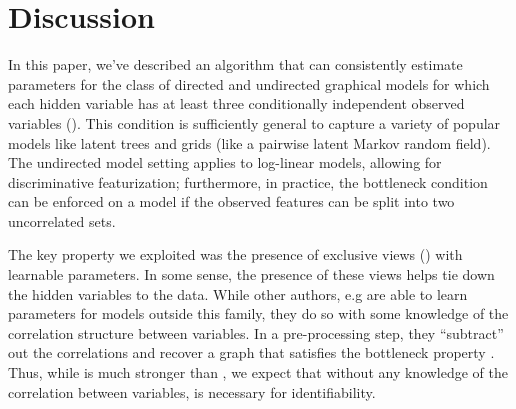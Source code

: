 \section{Discussion}
\label{sec:discussion}

In this paper, we've described an algorithm that can consistently
  estimate parameters for the class of directed and undirected graphical
  models for which each hidden variable has at least three conditionally
  independent observed variables ().
This condition is sufficiently general to capture a variety of popular
  models like latent trees and grids (like a pairwise latent Markov
  random field).
The undirected model setting applies to log-linear models, allowing
  for discriminative featurization; furthermore, in practice, the
  bottleneck condition can be enforced on a model if the observed
  features can be split into two uncorrelated sets.

The key property we exploited was the presence of exclusive views
  () with learnable parameters.
In some sense, the presence of these views helps tie down the hidden
  variables to the data. 
While other authors, e.g \citet{anandkumar12lda, anandkumar12linear,
  halpern13noisyor} are able to learn parameters for models outside this
  family, they do so with some knowledge of the correlation structure
  between variables. 
In a pre-processing step, they ``subtract'' out the correlations and
  recover a graph that satisfies the bottleneck property
  .
Thus, while  is much stronger than
  , we expect that without any knowledge of
  the correlation between variables,  is
  necessary for identifiability.


